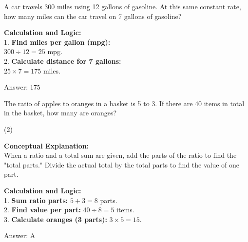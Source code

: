 \documentclass[11pt,paper=a4,answers]{exam}
\begin{document}
\begin{questions}
\vspace{60pt}

\question
A car travels 300 miles using 12 gallons of gasoline. At this same constant rate, how many miles can the car travel on 7 gallons of gasoline?

\begin{solution}
\textbf{Calculation and Logic:} \\
1. \textbf{Find miles per gallon (mpg):} \\
$300 \div 12 = 25$ mpg. \\
2. \textbf{Calculate distance for 7 gallons:} \\
$25 \times 7 = 175$ miles.

\vspace{30pt}

Answer: \colorbox{yellow!100}{175}
\end{solution}

\vspace{60pt}

\question
The ratio of apples to oranges in a basket is 5 to 3. If there are 40 items in total in the basket, how many are oranges?
\begin{tasks}(2)
\end{tasks}

\begin{solution}
\textbf{Conceptual Explanation:} \\
When a ratio and a total sum are given, add the parts of the ratio to find the "total parts." Divide the actual total by the total parts to find the value of one part.

\vspace{30pt}

\textbf{Calculation and Logic:} \\
1. \textbf{Sum ratio parts:} $5 + 3 = 8$ parts. \\
2. \textbf{Find value per part:} $40 \div 8 = 5$ items. \\
3. \textbf{Calculate oranges (3 parts):} $3 \times 5 = 15$.

\vspace{30pt}

Answer: \colorbox{yellow!100}{A}
\end{solution}

\vspace{60pt}


\end{questions}
\end{document}
